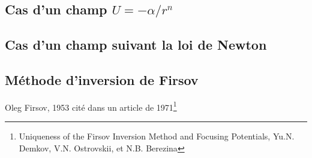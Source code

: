 \subsection{Cas d'un champ $U = -\alpha / r^{n}$}

\subsection{Cas d'un champ suivant la loi de Newton}

\subsection{M\'ethode d'inversion de Firsov}

Oleg Firsov, 1953 cit\'e dans un article de 1971\footnote{Uniqueness of the Firsov Inversion Method and Focusing Potentials, Yu.N. Demkov, V.N. Ostrovskii, et N.B. Berezina}